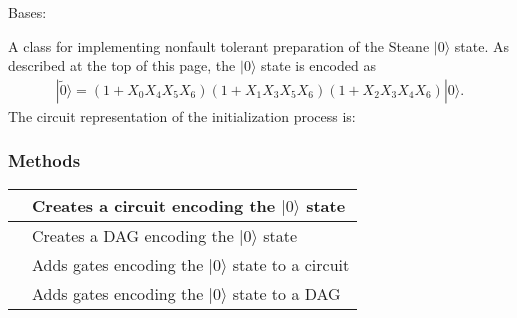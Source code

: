 \documentclass[letterpaper,10pt,english]{sphinxmanual}
\begin{document}
\begin{fulllineitems}
\label{\detokenize{Steane:Steane.SteaneEncoder}}
Bases: {\hyperref[\detokenize{Base:BaseFaultTolerance.Encoder}]{}}

A class for implementing non\sphinxhyphen{}fault tolerant preparation of the Steane \(|0\rangle\) state.
As described at the top of this page, the \(|0\rangle\) state is encoded as 
\begin{equation*}
\begin{split}|\tilde{0}\rangle = (1+X_0X_4X_5X_6)(1+X_1X_3X_5X_6)(1+X_2X_3X_4X_6)|0\rangle.\end{split}
\end{equation*}
The circuit representation of the initialization process is:

\begin{figure}[htbp]
\centering

\noindent{}
\end{figure}
\subsubsection*{Methods}


\begin{savenotes}\sphinxattablestart
\centering
\begin{tabulary}{\linewidth}[t]{|T|T|}
\hline

&
Creates a circuit encoding the \(|0\rangle\) state
\\
\hline
{}
&
Creates a DAG encoding the \(|0\rangle\) state
\\
\hline
{}
&
Adds gates encoding the \(|0\rangle\) state to a circuit
\\
\hline
{}
&
Adds gates encoding the \(|0\rangle\) state to a DAG
\\
\hline
\end{tabulary}
\par
\sphinxattableend\end{savenotes}


\end{fulllineitems}
\end{document}
